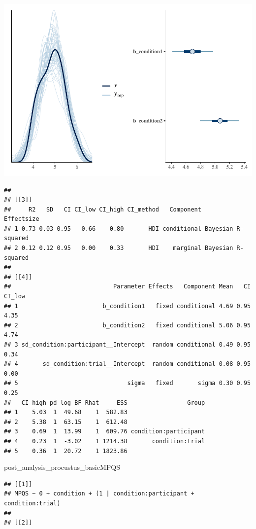 \documentclass[
]{article}
\newenvironment{Shaded}{\begin{snugshade}}{\end{snugshade}}
\newcommand{\NormalTok}[1]{#1}
\begin{document}
\includegraphics{08_Publish_GUSO_ASIL_files/figure-latex/DiagnosticsQ-1.pdf}

\begin{verbatim}
## 
## [[3]]
##     R2   SD   CI CI_low CI_high CI_method   Component         Effectsize
## 1 0.73 0.03 0.95   0.66    0.80       HDI conditional Bayesian R-squared
## 2 0.12 0.12 0.95   0.00    0.33       HDI    marginal Bayesian R-squared
## 
## [[4]]
##                             Parameter Effects   Component Mean   CI CI_low
## 1                        b_condition1   fixed conditional 4.69 0.95   4.35
## 2                        b_condition2   fixed conditional 5.06 0.95   4.74
## 3 sd_condition:participant__Intercept  random conditional 0.49 0.95   0.34
## 4       sd_condition:trial__Intercept  random conditional 0.08 0.95   0.00
## 5                               sigma   fixed       sigma 0.30 0.95   0.25
##   CI_high pd log_BF Rhat     ESS                 Group
## 1    5.03  1  49.68    1  582.83                      
## 2    5.38  1  63.15    1  612.48                      
## 3    0.69  1  13.99    1  609.76 condition:participant
## 4    0.23  1  -3.02    1 1214.38       condition:trial
## 5    0.36  1  20.72    1 1823.86
\end{verbatim}

\begin{Shaded}
\begin{Highlighting}[]
\NormalTok{post\_analysis\_procustus\_basicMPQS}
\end{Highlighting}
\end{Shaded}

\begin{verbatim}
## [[1]]
## MPQS ~ 0 + condition + (1 | condition:participant + condition:trial) 
## 
## [[2]]
\end{verbatim}
\end{document}
